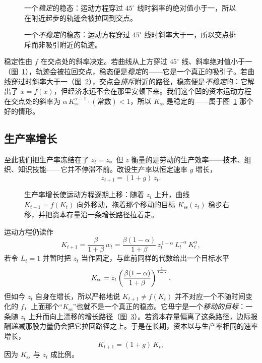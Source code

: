 \begin{figure}[h]
\centering

\caption{一个\emph{稳定}的稳态：运动方程穿过 $45^\circ$ 线时斜率的绝对值小于一，所以在附近起步的轨迹会被拉回到交点。}
\label{fig:macro-7}
\end{figure}

\begin{figure}[h]
\centering

\caption{一个\emph{不稳定}的稳态：运动方程穿过 $45^\circ$ 线时斜率大于一，所以交点排斥而非吸引附近的轨迹。}
\label{fig:macro-8}
\end{figure}

稳定性由 $f$ 在交点处的斜率决定。若曲线从上方穿过 $45^\circ$ 线、斜率绝对值小于一（图~\ref{fig:macro-7}），轨迹会被拉回交点，稳态便是\emph{稳定}的——它是一个真正的吸引子。若曲线穿过时斜率大于一（图~\ref{fig:macro-8}），交点会\emph{排斥}附近的路径，稳态便是\emph{不稳定}的：它解出了 $x = f(x)$，但经济永远不会在那里安顿下来。我们这个凹的资本运动方程在交点处的斜率为 $\alpha\, K_{\mathrm{ss}}^{\alpha-1}\cdot(\text{常数}) < 1$，所以 $K_{\mathrm{ss}}$ 是稳定的——属于图~\ref{fig:macro-7} 那个好的情形。

\subsection{生产率增长}

至此我们把生产率冻结在了 $z_t = z$。但 $z$ 衡量的是劳动的生产效率——技术、组织、知识技能——它并不停滞不前。改设生产率以恒定速率 $g$ 增长，
\[
z_{t+1} = (1+g)\, z_t.
\]

\begin{figure}[h]
\centering

\caption{生产率增长使运动方程逐期上移：随着 $z_t$ 上升，曲线 $K_{t+1}=f(K_t)$ 向外移动，拖着那个移动的目标 $K_{\mathrm{ss}}(z_t)$ 稳步右移，并把资本存量沿一条增长路径拉着走。}
\label{fig:macro-9}
\end{figure}

运动方程仍读作
\[
K_{t+1} = \frac{\beta}{1+\beta}\, w_t = \frac{\beta(1-\alpha)}{1+\beta}\, z_t^{\,1-\alpha}\, L_t^{-\alpha}\, K_t^{\alpha},
\]
若令 $L_t = 1$ 并暂时把 $z_t$ 当作固定，与此前同样的代数给出一个目标水平
\[
K_{\mathrm{ss}} = z_t\left(\frac{\beta(1-\alpha)}{1+\beta}\right)^{\frac{1}{1-\alpha}}.
\]
但如今 $z_t$ 自身在增长，所以严格地说 $K_{t+1} \ne f(K_t)$ 并不对应一个不随时间变化的 $f$，上面那个“$K_{\mathrm{ss}}$”也就不是一个真正的稳态。它毋宁是一个\emph{移动的目标}：一条随 $z_t$ 上升而向上漂移的增长路径（图~\ref{fig:macro-9}）。若资本存量偏离了这条路径，边际报酬递减那股力量仍会把它拉回路径之上。于是在长期，资本以与生产率相同的速率增长，
\[
K_{t+1} = (1+g)\, K_t,
\]
因为 $K_{\mathrm{ss}}$ 与 $z_t$ 成比例。

